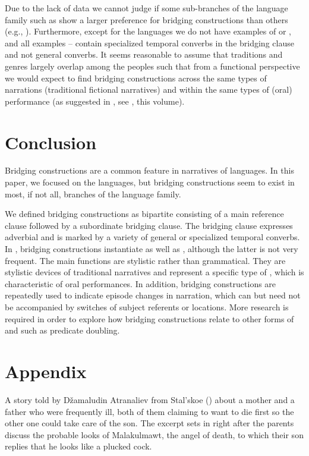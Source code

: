\documentclass[output=paper]{LSP/langsci}
\begin{document}
Due to the lack of data we cannot judge if some sub-branches of the  language family such as  show a larger preference for bridging constructions than others (e.g., ). Furthermore, except for the  languages we do not have examples of  or , and all examples -- contain specialized temporal converbs in the bridging clause and not general converbs. It seems reasonable to assume that  traditions and genres largely overlap among the  peoples such that from a functional perspective we would expect to find bridging constructions across the same types of narrations (traditional fictional narratives) and within the same types of (oral) performance  (as suggested in , see \citeauthor{emlen18}, this volume). 


\section{Conclusion}
\label{sec:Conclusion}
Bridging constructions are a common feature in narratives of  languages. In this paper, we focused on the  languages, but bridging constructions seem to exist in most, if not all, branches of the  language family.

We defined bridging constructions as bipartite consisting of a main reference clause followed by a subordinate bridging clause. The bridging clause expresses adverbial  and is marked by a variety of general or specialized temporal converbs. In , bridging constructions instantiate  as well as , although the latter is not very frequent. The main functions are stylistic rather than grammatical. They are stylistic devices of traditional narratives and represent a specific type of , which is characteristic of oral performances. In addition,  bridging constructions are repeatedly used to indicate episode changes in narration, which can but need not be accompanied by switches of subject referents or locations. More research is required in order to explore how bridging constructions relate to other forms of  and  such as predicate doubling.
 

 \section*{Appendix}
 \setcounter{equation}{0}
A  story told by Džamaludin Atranaliev from Stal’skoe (\citealt[154--157]{vandenBerg.1995})  about a mother and a father who were frequently ill, both of them claiming to want to die first so the other one could take care of the son. The excerpt sets in right after the parents discuss the probable looks of Malakulmawt, the angel of death, to which their son replies that he looks like a plucked cock.
\end{document}
